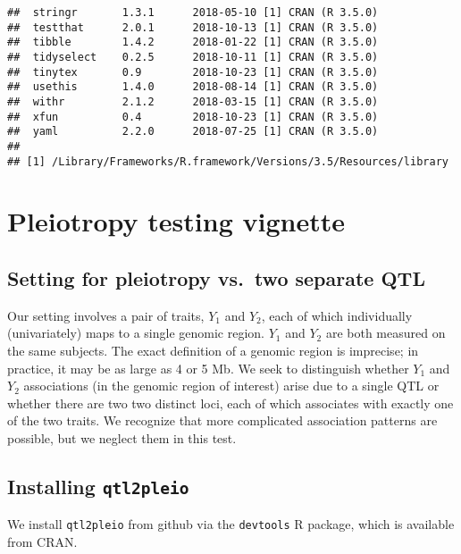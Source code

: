 \documentclass{book}
\begin{document}
\begin{verbatim}
##  stringr       1.3.1      2018-05-10 [1] CRAN (R 3.5.0)                   
##  testthat      2.0.1      2018-10-13 [1] CRAN (R 3.5.0)                   
##  tibble        1.4.2      2018-01-22 [1] CRAN (R 3.5.0)                   
##  tidyselect    0.2.5      2018-10-11 [1] CRAN (R 3.5.0)                   
##  tinytex       0.9        2018-10-23 [1] CRAN (R 3.5.0)                   
##  usethis       1.4.0      2018-08-14 [1] CRAN (R 3.5.0)                   
##  withr         2.1.2      2018-03-15 [1] CRAN (R 3.5.0)                   
##  xfun          0.4        2018-10-23 [1] CRAN (R 3.5.0)                   
##  yaml          2.2.0      2018-07-25 [1] CRAN (R 3.5.0)                   
## 
## [1] /Library/Frameworks/R.framework/Versions/3.5/Resources/library
\end{verbatim}

\section{Pleiotropy testing vignette}

\hypertarget{setting-for-pleiotropy-vs.two-separate-qtl}{%
\subsection{Setting for pleiotropy vs.~two separate
QTL}\label{setting-for-pleiotropy-vs.two-separate-qtl}}

Our setting involves a pair of traits, \(Y_1\) and \(Y_2\), each of
which individually (univariately) maps to a single genomic region.
\(Y_1\) and \(Y_2\) are both measured on the same subjects. The exact
definition of a genomic region is imprecise; in practice, it may be as
large as 4 or 5 Mb. We seek to distinguish whether \(Y_1\) and \(Y_2\)
associations (in the genomic region of interest) arise due to a single
QTL or whether there are two two distinct loci, each of which associates
with exactly one of the two traits. We recognize that more complicated
association patterns are possible, but we neglect them in this test.

\hypertarget{installing-qtl2pleio}{%
\subsection{\texorpdfstring{Installing
\texttt{qtl2pleio}}{Installing qtl2pleio}}\label{installing-qtl2pleio}}

We install \texttt{qtl2pleio} from github via the \texttt{devtools} R
package, which is available from CRAN.
\end{document}
